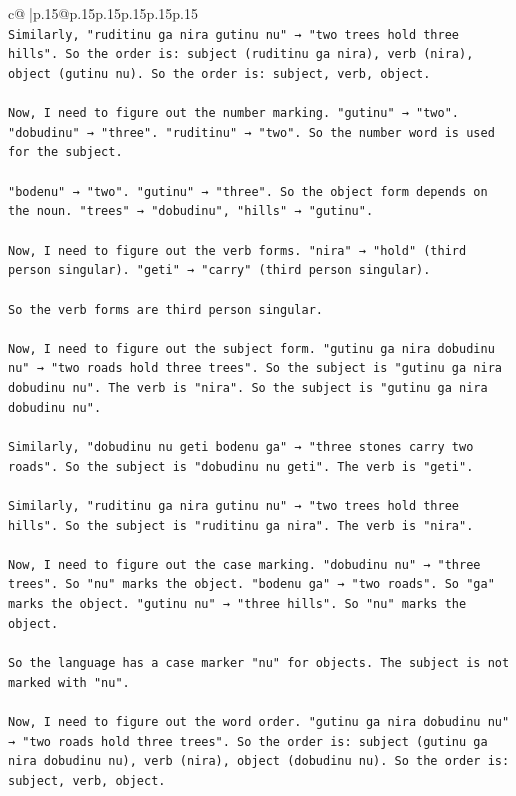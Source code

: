\documentclass{article}
\begin{document}
{\begin{supertabular}{c@{$\;$}|p{.15\linewidth}@{}p{.15\linewidth}p{.15\linewidth}p{.15\linewidth}p{.15\linewidth}p{.15\linewidth}}
{{{\\ 
\texttt{Similarly, "ruditinu ga nira gutinu nu" → "two trees hold three hills". So the order is: subject (ruditinu ga nira), verb (nira), object (gutinu nu). So the order is: subject, verb, object.} \\
\\ 
\texttt{Now, I need to figure out the number marking. "gutinu" → "two". "dobudinu" → "three". "ruditinu" → "two". So the number word is used for the subject.} \\
\\ 
\texttt{"bodenu" → "two". "gutinu" → "three". So the object form depends on the noun. "trees" → "dobudinu", "hills" → "gutinu".} \\
\\ 
\texttt{Now, I need to figure out the verb forms. "nira" → "hold" (third person singular). "geti" → "carry" (third person singular).} \\
\\ 
\texttt{So the verb forms are third person singular.} \\
\\ 
\texttt{Now, I need to figure out the subject form. "gutinu ga nira dobudinu nu" → "two roads hold three trees". So the subject is "gutinu ga nira dobudinu nu". The verb is "nira". So the subject is "gutinu ga nira dobudinu nu".} \\
\\ 
\texttt{Similarly, "dobudinu nu geti bodenu ga" → "three stones carry two roads". So the subject is "dobudinu nu geti". The verb is "geti".} \\
\\ 
\texttt{Similarly, "ruditinu ga nira gutinu nu" → "two trees hold three hills". So the subject is "ruditinu ga nira". The verb is "nira".} \\
\\ 
\texttt{Now, I need to figure out the case marking. "dobudinu nu" → "three trees". So "nu" marks the object. "bodenu ga" → "two roads". So "ga" marks the object. "gutinu nu" → "three hills". So "nu" marks the object.} \\
\\ 
\texttt{So the language has a case marker "nu" for objects. The subject is not marked with "nu".} \\
\\ 
\texttt{Now, I need to figure out the word order. "gutinu ga nira dobudinu nu" → "two roads hold three trees". So the order is: subject (gutinu ga nira dobudinu nu), verb (nira), object (dobudinu nu). So the order is: subject, verb, object.} \\
}}}
\end{supertabular}}
\end{document}
